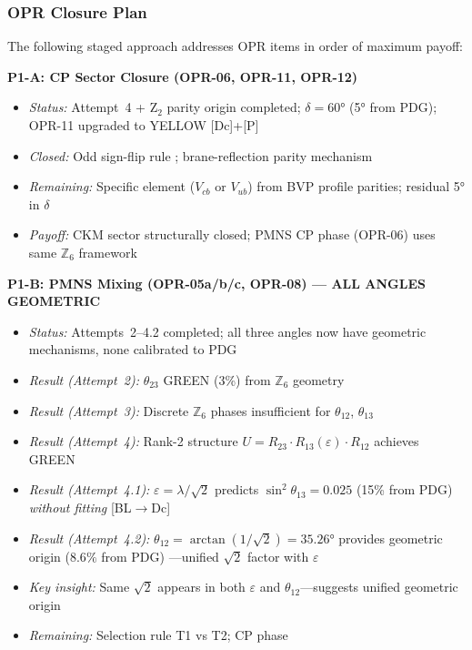 \subsubsection{OPR Closure Plan}

\begin{tcolorbox}[breakable, enhanced, colback=blue!5, colframe=blue!60!black,
    title=\textbf{OPR Closure Plan: Prioritized Research Program}, width=\linewidth]
The following staged approach addresses OPR items in order of maximum payoff:

\textbf{P1-A: CP Sector Closure (OPR-06, OPR-11, OPR-12)}
\begin{itemize}[nosep]
    \item \emph{Status:} Attempt~4 + Z$_2$ parity origin completed; $\delta = 60°$ (5° from PDG); OPR-11 upgraded to YELLOW [Dc]+[P]
    \item \emph{Closed:} Odd sign-flip rule \tagDc{}; brane-reflection parity mechanism \tagP{}
    \item \emph{Remaining:} Specific element ($V_{cb}$ or $V_{ub}$) from BVP profile parities; residual 5° in $\delta$
    \item \emph{Payoff:} CKM sector structurally closed; PMNS CP phase (OPR-06) uses same $\mathbb{Z}_6$ framework
\end{itemize}

\textbf{P1-B: PMNS Mixing (OPR-05a/b/c, OPR-08) --- ALL ANGLES GEOMETRIC}
\begin{itemize}[nosep]
    \item \emph{Status:} Attempts~2--4.2 completed; all three angles now have geometric mechanisms, none calibrated to PDG
    \item \emph{Result (Attempt~2):} $\theta_{23}$ GREEN (3\%) from $\mathbb{Z}_6$ geometry \tagDc{}
    \item \emph{Result (Attempt~3):} Discrete $\mathbb{Z}_6$ phases insufficient for $\theta_{12}$, $\theta_{13}$
    \item \emph{Result (Attempt~4):} Rank-2 structure $U = R_{23} \cdot R_{13}(\varepsilon) \cdot R_{12}$ achieves GREEN
    \item \emph{Result (Attempt~4.1):} $\varepsilon = \lambda/\sqrt{2}$ predicts $\sin^2\theta_{13} = 0.025$ (15\% from PDG) \emph{without fitting} [BL$\to$Dc]
    \item \emph{Result (Attempt~4.2):} $\theta_{12} = \arctan(1/\sqrt{2}) = 35.26°$ provides geometric origin ($8.6\%$ from PDG) \tagDc{}---unified $\sqrt{2}$ factor with $\varepsilon$
    \item \emph{Key insight:} Same $\sqrt{2}$ appears in both $\varepsilon$ and $\theta_{12}$---suggests unified geometric origin
    \item \emph{Remaining:} Selection rule T1 vs T2; CP phase
\end{itemize}
\noindent{}


\end{tcolorbox}
